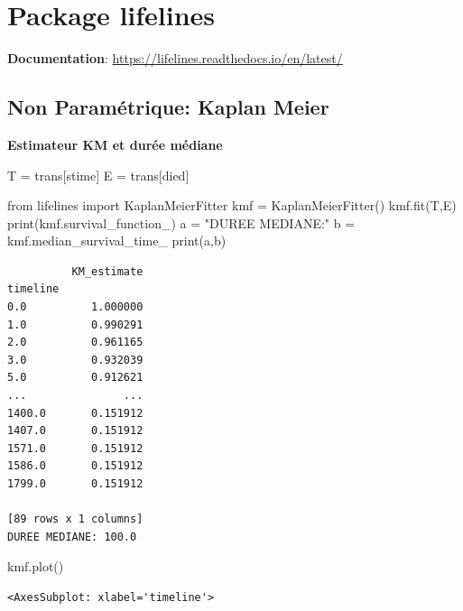 \documentclass[
  12pt,
  letterpaper,
  DIV=11,
  numbers=noendperiod,
  onepage,
  openany]{scrreprt}
\newenvironment{Shaded}{\begin{snugshade}}{\end{snugshade}}
\newcommand{\BuiltInTok}[1]{\textcolor[rgb]{0.80,0.80,0.80}{#1}}
\newcommand{\ImportTok}[1]{\textcolor[rgb]{0.80,0.80,0.80}{#1}}
\newcommand{\NormalTok}[1]{\textcolor[rgb]{0.80,0.80,0.80}{#1}}
\newcommand{\OperatorTok}[1]{\textcolor[rgb]{0.94,0.94,0.82}{#1}}
\newcommand{\StringTok}[1]{\textcolor[rgb]{0.80,0.58,0.58}{#1}}
\begin{document}
\hypertarget{package-lifelines}{%
\section{Package lifelines}\label{package-lifelines}}

\textbf{Documentation}:
\url{https://lifelines.readthedocs.io/en/latest/}

\hypertarget{non-paramuxe9trique-kaplan-meier}{%
\subsection{Non Paramétrique: Kaplan
Meier}\label{non-paramuxe9trique-kaplan-meier}}

\textbf{Estimateur KM et durée médiane}

\begin{Shaded}
\begin{Highlighting}[]
\NormalTok{T }\OperatorTok{=}\NormalTok{ trans[}\StringTok{\textquotesingle{}stime\textquotesingle{}}\NormalTok{]}
\NormalTok{E }\OperatorTok{=}\NormalTok{ trans[}\StringTok{\textquotesingle{}died\textquotesingle{}}\NormalTok{]}


\ImportTok{from}\NormalTok{ lifelines }\ImportTok{import}\NormalTok{ KaplanMeierFitter}
\NormalTok{kmf }\OperatorTok{=}\NormalTok{ KaplanMeierFitter()}
\NormalTok{kmf.fit(T,E)}
\BuiltInTok{print}\NormalTok{(kmf.survival\_function\_)}
\NormalTok{a }\OperatorTok{=} \StringTok{"DUREE MEDIANE:"}
\NormalTok{b }\OperatorTok{=}\NormalTok{ kmf.median\_survival\_time\_}
\BuiltInTok{print}\NormalTok{(a,b)}
\end{Highlighting}
\end{Shaded}

\begin{verbatim}
          KM_estimate
timeline             
0.0          1.000000
1.0          0.990291
2.0          0.961165
3.0          0.932039
5.0          0.912621
...               ...
1400.0       0.151912
1407.0       0.151912
1571.0       0.151912
1586.0       0.151912
1799.0       0.151912

[89 rows x 1 columns]
DUREE MEDIANE: 100.0
\end{verbatim}

\begin{Shaded}
\begin{Highlighting}[]
\NormalTok{kmf.plot()}
\end{Highlighting}
\end{Shaded}

\begin{verbatim}
<AxesSubplot: xlabel='timeline'>
\end{verbatim}
\end{document}
